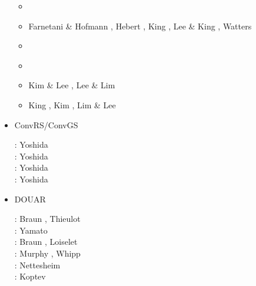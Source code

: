 \begin{itemize}
\begin{scriptsize}
\begin{itemize}
\item[\twothousandeight] \cite{hash08}
\item[\twothousandnine] Farnetani \& Hofmann \cite{faho09}, Hebert \etal \cite{heaa09}, King \cite{king09}, 
                  Lee \& King \cite{leki09}, Watters \etal \cite{wazh09}
\item[\twothousandten] \cite{kilv10}\cite{cows10}\cite{hash10}\cite{leki10}
\item[\twothousandeleven] \cite{hash11}\cite{leki11}
\item[\twothousandfourteen] Kim \& Lee \cite{kile14}, Lee \& Lim \cite{leli14}
\item[\twothousandfifteen] King \etal \cite{kifr15}, Kim \etal \cite{kilk15}, Lim \& Lee \cite{lile15}
\end{itemize}
\end{scriptsize}

\item {\codefont ConvRS/ConvGS} 

\begin{scriptsize}
\noindent
\twothousandeight:
Yoshida \cite{yosh08}\\
\twothousandtwelve:
Yoshida \etal \cite{yoth12}\\
\twothousandthirteen:
Yoshida \cite{yosh13} \\
\twothousandtwenty:
Yoshida \etal \cite{yosy20}
\end{scriptsize} 

\item {\codefont DOUAR} 

\begin{scriptsize}
\noindent
\twothousandeight: Braun \etal  \cite{brtf08}, Thieulot \etal  \cite{thfb08}\\
\twothousandnine: Yamato \etal  \cite{yahb09}\\
\twothousandten: Braun \etal \cite{brya10}, Loiselet \etal \cite{lobh10}\\
\twothousandfourteen: Murphy \etal \cite{mutg14}, Whipp \etal \cite{whbb14}\\
\twothousandeighteen: Nettesheim \etal \cite{neew18}\\
\twothousandnineteen: Koptev \etal \cite{koen19}
\end{scriptsize} 


\end{itemize}
